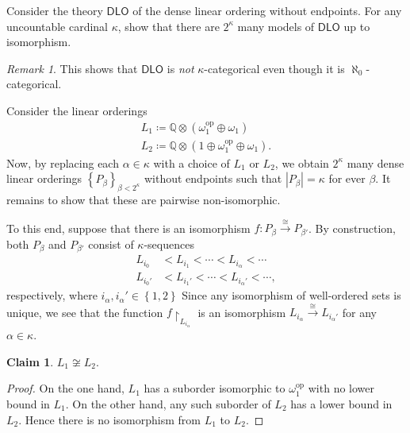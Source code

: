 \documentclass[10pt,letterpaper,cm]{nupset}
\theoremstyle{definition}
\theoremstyle{theorem}
\newtheorem{claim}{Claim}
\theoremstyle{remark}
\newtheorem*{remark}{Remark}
\newcommand{\Q}{\mathbb Q}
\newcommand{\1}{\mathbb{1}}
\newcommand{\0}{\vec 0}
\DeclareMathOperator{\op}{op}
\begin{document}
\begin{problem}[5.]
Consider the theory $\mathsf{DLO}$ of the dense linear ordering without endpoints. For any uncountable cardinal $\kappa$, show that there are $2^{\kappa}$ many models of $\mathsf{DLO}$ up to isomorphism.
\begin{remark}
This shows that $\mathsf{DLO}$ is \emph{not} $\kappa$-categorical even though it is $\aleph_0$-categorical.
\end{remark}
\end{problem}
\begin{solution}
Consider the linear orderings 
\begin{gather*}
L_1 \coloneqq \Q \otimes\left(\omega_1^{\op}  \oplus \omega_1  \right)
\\ L_2\coloneqq  \Q \otimes\left(1 \oplus \omega_1^{\op}  \oplus \omega_1 \right).
\end{gather*}
Now, by replacing each $\alpha \in \kappa$ with a choice of $L_1$ or $L_2$, we obtain $2^{\kappa}$ many dense linear orderings $\left\{P_{\beta}\right\}_{\beta< 2^{\kappa}}$ without endpoints such that $\left\lvert{P_{\beta}}\right\rvert=\kappa$ for ever $\beta$. It remains to show that these are pairwise non-isomorphic.

\smallskip

To this end, suppose that there is an isomorphism $f: P_{\beta} \overset{\cong}{\longrightarrow} P_{\beta'}$. By construction, both $P_{\beta}$ and $P_{\beta'}$ consist of $\kappa$-sequences 
\begin{align*}
L_{i_0} & < L_{i_1} < \cdots < L_{i_{\alpha}} < \cdots
\\ L_{i_0'} & < L_{i_1'} < \cdots < L_{i_{\alpha}'} < \cdots, 
\end{align*}
respectively, where $i_{\alpha}, i_{\alpha}'\in \left\{1,2\right\}$ Since any isomorphism of well-ordered sets is unique, we see that the function $f\restriction_{L_{i_{\alpha}}}$ is an isomorphism $L_{i_{\alpha}} \overset{\cong}{\longrightarrow} L_{i_{\alpha}'}$ for any $\alpha \in \kappa$.

\begin{claim}
$L_1 \not\cong L_2$.
\end{claim}
\begin{proof}
On the one hand,  $L_1$ has a suborder isomorphic to $\omega_1^{\op}$ with no lower bound in $L_1$. On the other hand, any such suborder of $L_2$ has a lower bound in $L_2$. Hence there is no isomorphism from $L_1$ to $L_2$.
\end{proof}


\end{solution}
\end{document}
